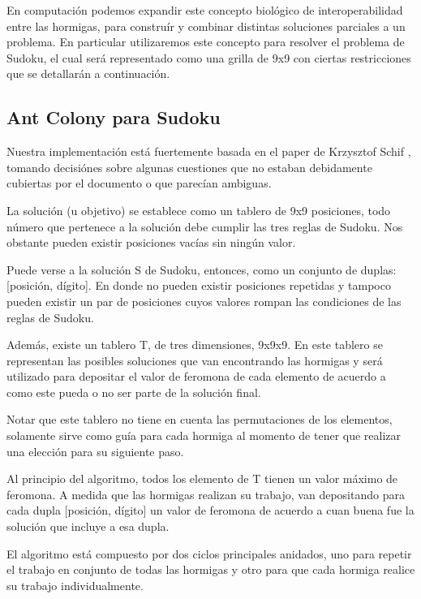\documentclass[a4paper,spanish]{article}
\begin{document}
En computación podemos expandir este concepto biológico de interoperabilidad entre las hormigas,
para construír y combinar distintas soluciones parciales a un problema. En particular utilizaremos
este concepto para resolver el problema de Sudoku, el cual será representado como una grilla
de 9x9 con ciertas restricciones que se detallarán a continuación.

\clearpage

\subsection{Ant Colony para Sudoku}

Nuestra implementación está fuertemente basada en el paper de Krzysztof Schif \cite{ant_colony},
tomando decisiónes sobre algunas cuestiones que no estaban debidamente cubiertas por el documento
o que parecían ambiguas.

La solución (u objetivo) se establece como un tablero de 9x9 posiciones, todo número que
pertenece a la solución debe cumplir las tres reglas de Sudoku. Nos obstante pueden existir
posiciones vacías sin ningún valor.

Puede verse a la solución S de Sudoku, entonces, como un conjunto de duplas: [posición, dígito].
En donde no pueden existir posiciones repetidas y tampoco pueden existir un par de posiciones
cuyos valores rompan las condiciones de las reglas de Sudoku.

Además, existe un tablero T, de tres dimensiones, 9x9x9. En este tablero se representan las
posibles soluciones que van encontrando las hormigas y será utilizado para depositar el valor
de feromona de cada elemento de acuerdo a como este pueda o no ser parte de la solución final.

Notar que este tablero no tiene en cuenta las permutaciones de los elementos,
solamente sirve como guía para cada hormiga al momento de tener que realizar una elección
para su siguiente paso.

Al principio del algoritmo, todos los elemento de T tienen un valor máximo de feromona. A medida
que las hormigas realizan su trabajo, van depositando para cada dupla [posición, dígito] un valor
de feromona de acuerdo a cuan buena fue la solución que incluye a esa dupla.

El algoritmo está compuesto por dos ciclos principales anidados, uno para repetir el trabajo en
conjunto de todas las hormigas y otro para que cada hormiga realice su trabajo individualmente.
\end{document}
